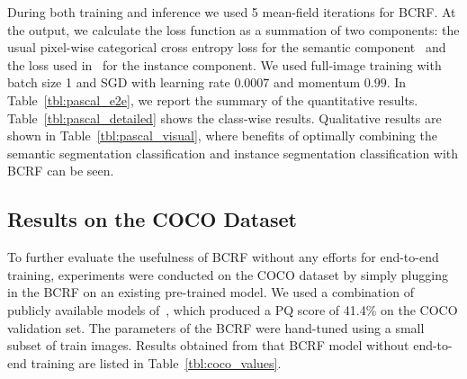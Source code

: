 During both training and inference we used 5 mean-field iterations for BCRF. At the output, we calculate the loss function as a summation of two components: the usual pixel-wise categorical cross entropy loss for the semantic component~\cite{FCN_2015} and the loss used in~\cite{Anurag17} for the instance component. We used full-image training with batch size 1 and SGD with learning rate $0.0007$ and momentum $0.99$. In Table~\ref{tbl:pascal_e2e}, we report the summary of the quantitative results. Table~\ref{tbl:pascal_detailed} shows the class-wise results. Qualitative results are shown in Table~\ref{tbl:pascal_visual}, where benefits of optimally combining the semantic segmentation classification and instance segmentation classification with BCRF can be seen.


\subsection{Results on the COCO Dataset}
To further evaluate the usefulness of BCRF without any efforts for end-to-end training, experiments were conducted on the COCO dataset by simply plugging in the BCRF on an existing pre-trained model. We used a combination of publicly available models of~\cite{Upsnet_paper, object_detection_api}, which produced a PQ score of 41.4\% on the COCO validation set. The parameters of the BCRF were hand-tuned using a small subset of train images. Results obtained from that BCRF model without end-to-end training are listed in Table~\ref{tbl:coco_values}.
